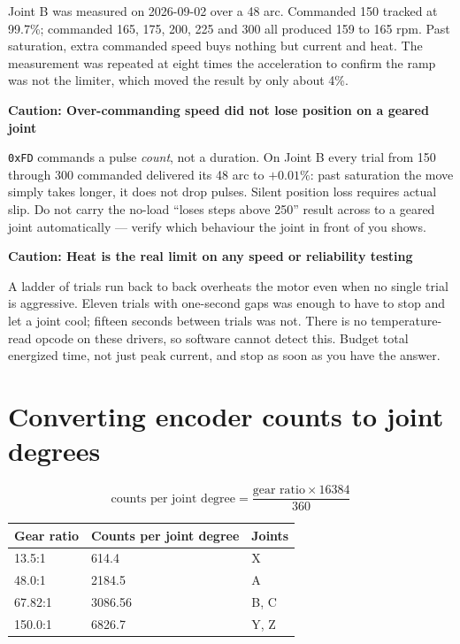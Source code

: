 \documentclass[11pt,letterpaper]{article}
\newenvironment{caution}[1]{%
    \par\addvspace{8pt}%
    \noindent{\color{cautionred}\rule{\linewidth}{0.8pt}}\par\vspace{2pt}
    \noindent\textbf{\color{cautionred}Caution: #1}\par\vspace{2pt}
}{%
    \par\vspace{2pt}\noindent{\color{cautionred}\rule{\linewidth}{0.4pt}}%
    \par\addvspace{8pt}%
}
\begin{document}
Joint B was measured on 2026-09-02 over a 48\textdegree{} arc. Commanded 150 tracked
at 99.7\%; commanded 165, 175, 200, 225 and 300 all produced 159 to 165 rpm. Past
saturation, extra commanded speed buys nothing but current and heat. The measurement
was repeated at eight times the acceleration to confirm the ramp was not the limiter,
which moved the result by only about 4\%.

\begin{caution}{Over-commanding speed did not lose position on a geared joint}
\texttt{0xFD} commands a pulse \emph{count}, not a duration. On Joint B every trial
from 150 through 300 commanded delivered its 48\textdegree{} arc to $+0.01\%$: past
saturation the move simply takes longer, it does not drop pulses. Silent position
loss requires actual slip. Do not carry the no-load ``loses steps above 250'' result
across to a geared joint automatically --- verify which behaviour the joint in front
of you shows.
\end{caution}

\begin{caution}{Heat is the real limit on any speed or reliability testing}
A ladder of trials run back to back overheats the motor even when no single trial is
aggressive. Eleven trials with one-second gaps was enough to have to stop and let a
joint cool; fifteen seconds between trials was not. There is no temperature-read
opcode on these drivers, so software cannot detect this. Budget total energized time,
not just peak current, and stop as soon as you have the answer.
\end{caution}

\section{Converting encoder counts to joint degrees}

\[
\text{counts per joint degree} = \frac{\text{gear ratio} \times 16384}{360}
\]

\begin{center}
\begin{tabular}{lll}
\toprule
\textbf{Gear ratio} & \textbf{Counts per joint degree} & \textbf{Joints} \\ \midrule
13.5:1  & 614.4   & X \\
48.0:1  & 2184.5  & A \\
67.82:1 & 3086.56 & B, C \\
150.0:1 & 6826.7  & Y, Z \\
\bottomrule
\end{tabular}
\end{center}
\end{document}
